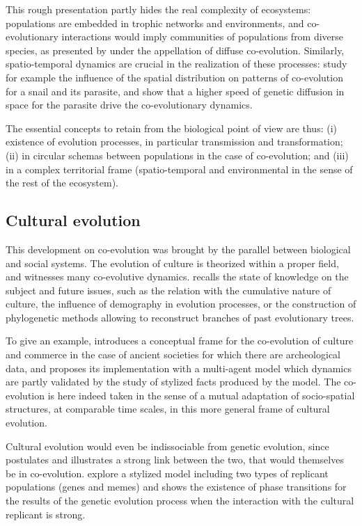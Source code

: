 \documentclass[letterpaper]{article}
\begin{document}
This rough presentation partly hides the real complexity of ecosystems: populations are embedded in trophic networks and environments, and co-evolutionary interactions would imply communities of populations from diverse species, as presented by \cite{strauss2005toward} under the appellation of diffuse co-evolution. Similarly, spatio-temporal dynamics are crucial in the realization of these processes: \cite{dybdahl1996geography} study for example the influence of the spatial distribution on patterns of co-evolution for a snail and its parasite, and show that a higher speed of genetic diffusion in space for the parasite drive the co-evolutionary dynamics.


The essential concepts to retain from the biological point of view are thus: (i) existence of evolution processes, in particular transmission and transformation; (ii) in circular schemas between populations in the case of co-evolution; and (iii) in a complex territorial frame (spatio-temporal and environmental in the sense of the rest of the ecosystem).



\subsection{Cultural evolution}

This development on co-evolution was brought by the parallel between biological and social systems. The evolution of culture is theorized within a proper field, and witnesses many co-evolutive dynamics. \cite{Mesoudi25072017} recalls the state of knowledge on the subject and future issues, such as the relation with the cumulative nature of culture, the influence of demography in evolution processes, or the construction of phylogenetic methods allowing to reconstruct branches of past evolutionary trees.

To give an example, \cite{carrignon2015modelling} introduces a conceptual frame for the co-evolution of culture and commerce in the case of ancient societies for which there are archeological data, and proposes its implementation with a multi-agent model which dynamics are partly validated by the study of stylized facts produced by the model. The co-evolution is here indeed taken in the sense of a mutual adaptation of socio-spatial structures, at comparable time scales, in this more general frame of cultural evolution.


Cultural evolution would even be indissociable from genetic evolution, since \cite{durham1991coevolution} postulates and illustrates a strong link between the two, that would themselves be in co-evolution. \cite{bull2000meme} explore a stylized model including two types of replicant populations (genes and memes) and shows the existence of phase transitions for the results of the genetic evolution process when the interaction with the cultural replicant is strong.
\end{document}
